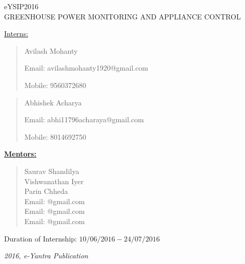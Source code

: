 \documentclass[a4paper,12pt,oneside]{book}
\begin{document}
\begin{titlepage}
	\raggedright
	{\Large eYSIP2016\\[1cm]}
	{\Large\scshape GREENHOUSE POWER MONITORING AND APPLIANCE CONTROL \\[.1in]}
	
	\vfill
	
	{\underline{\large{Interns:}}} \\
	\begin{quote}
		\large{Avilash Mohanty}
		
		\large{Email: avilashmohanty1920@gmail.com}		
		
		\large{Mobile: 9560372680}
	\end{quote}
	
	
	
	\begin{quote}
		\large{Abhishek Acharya}
		
		\large{Email: abhi11796acharaya@gmail.com}	
		
		\large{Mobile: 8014692750}
	\end{quote}
	
	
	\vspace{0.5cm}
	
	{\underline{\textbf{Mentors:}}} \\
	\begin{quote}
		\large{Saurav Shandilya}\\
		\large{Vishwanathan Iyer}\\
		\large{Parin Chheda}\\
		\large{Email: @gmail.com}\\
		\large{Email: @gmail.com}\\
		\large{Email: @gmail.com}\\
		
	\end{quote}
	
	
	
	\begin{flushright}
		{\large Duration of Internship: $ 10/06/2016-24/07/2016 $ \\}
		
	\end{flushright}
	{\itshape 2016, e-Yantra Publication}
	
	
	
\end{titlepage}
\end{document}
